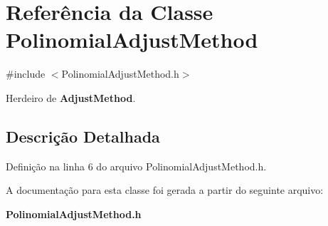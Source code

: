 \section{Referência da Classe Polinomial\+Adjust\+Method}
\label{class_polinomial_adjust_method}


{\ttfamily \#include $<$Polinomial\+Adjust\+Method.\+h$>$}



Herdeiro de {\bf Adjust\+Method}.



\subsection{Descrição Detalhada}


Definição na linha 6 do arquivo Polinomial\+Adjust\+Method.\+h.



A documentação para esta classe foi gerada a partir do seguinte arquivo\+:\begin{DoxyCompactItemize}
\item 
{\bf Polinomial\+Adjust\+Method.\+h}\end{DoxyCompactItemize}
